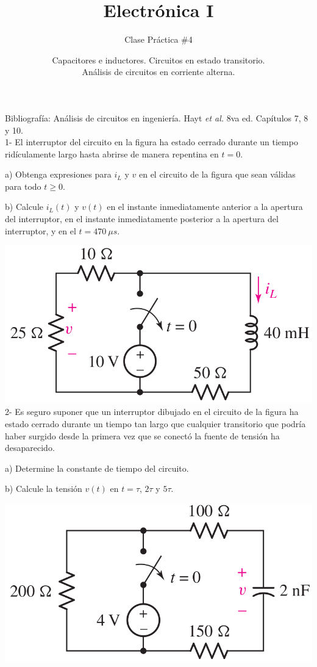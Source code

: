 \documentclass[10pt,letterpaper]{article}
\author{Clase Práctica $\#$4}
\title{Electrónica I}
\date{Capacitores e inductores. Circuitos en estado transitorio.\\
Análisis de circuitos en corriente alterna.}
\begin{document}
	\maketitle
	
Bibliografía: Análisis de circuitos en ingeniería. Hayt \textit{et al.} 8va ed. Capítulos 7, 8 y 10.
\\
 
 1- El interruptor del circuito en la figura ha estado cerrado durante un tiempo ridículamente largo hasta abrirse de manera repentina en $t = 0$. 
 
 a) Obtenga expresiones para $i_L$ y $v$ en el circuito de la figura que sean válidas para todo $t \geq 0$. 
 
 b) Calcule $i_L(t)$ y $v(t)$ en el instante inmediatamente anterior a la apertura del interruptor, en el instante inmediatamente posterior a la apertura del interruptor, y en el $t = 470 \: \mu s$.
 
 \includegraphics[scale=0.3]{c1}
 \\
 
 2- Es seguro suponer que un interruptor dibujado en el circuito de la figura ha estado cerrado durante un tiempo tan largo que cualquier transitorio que podría haber surgido desde la primera vez que se conectó la fuente de tensión ha desaparecido.
 
 a) Determine la constante de tiempo del circuito. 
 
 b) Calcule la tensión $v(t)$ en $t =\tau$, $2\tau$ y $5 \tau$.

\includegraphics[scale=0.3]{c2}
\end{document}
